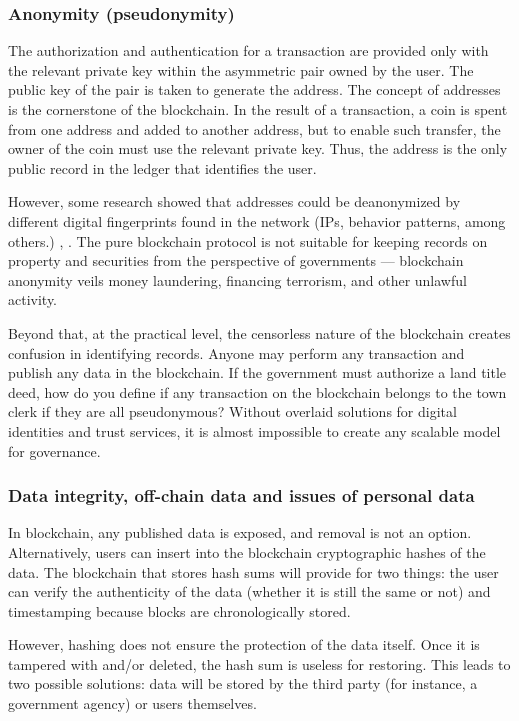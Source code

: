 \begin{multicols}{2}
\subsubsection{Anonymity (pseudonymity)}

The authorization and authentication for a transaction are provided only with the relevant private key within the asymmetric pair owned by the user. The public key of the pair is taken to generate the address. The concept of addresses is the cornerstone of the blockchain. In the result of a transaction, a coin is spent from one address and added to another address, but to enable such transfer, the owner of the coin must use the relevant private key. Thus, the address is the only public record in the ledger that identifies the user. 

However, some research showed that addresses could be deanonymized by different digital fingerprints found in the network (IPs, behavior patterns, among others.) \cite{art1-key15}, \cite{art1-key16}. The pure blockchain protocol is not suitable for keeping records on property and securities from the perspective of governments — blockchain anonymity veils money laundering, financing terrorism, and other unlawful activity.

Beyond that, at the practical level, the censorless nature of the blockchain creates confusion in identifying records. Anyone may perform any transaction and publish any data in the blockchain. If the government must authorize a land title deed, how do you define if any transaction on the blockchain belongs to the town clerk if they are all pseudonymous? Without overlaid solutions for digital identities and trust services, it is almost impossible to create any scalable model for governance.

\subsubsection{Data integrity, off-chain data and issues of personal data}

In blockchain, any published data is exposed, and removal is not an option. Alternatively, users can insert into the blockchain cryptographic hashes of the data. The blockchain that stores hash sums will provide for two things: the user can verify the authenticity of the data (whether it is still the same or not) and timestamping because blocks are chronologically stored.

However, hashing does not ensure the protection of the data itself. Once it is tampered with and/or deleted, the hash sum is useless for restoring. This leads to two possible solutions: data will be stored by the third party (for instance, a government agency) or users themselves.


\end{multicols}
